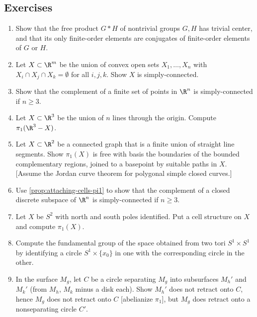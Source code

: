 \subsection*{Exercises}

\begin{enumerate}
\item Show that the free product $G*H$ of nontrivial groups $G,H$ has trivial
center, and that its only finite-order elements are conjugates of finite-order
elements of $G$ or $H$.

\item Let $X\subset\R^m$ be the union of convex open sets $X_1,\ldots,X_n$ with
$X_i\cap X_j\cap X_k=\emptyset$ for all $i,j,k$. Show $X$ is simply-connected.

\item Show that the complement of a finite set of points in $\R^n$ is
simply-connected if $n\ge 3$.

\item Let $X\subset\R^3$ be the union of $n$ lines through the origin. Compute
$\pi_1(\R^3-X)$.

\item Let $X\subset\R^2$ be a connected graph that is a finite union of straight line
segments. Show $\pi_1(X)$ is free with basis the boundaries of the bounded
complementary regions, joined to a basepoint by suitable paths in $X$. [Assume
the Jordan curve theorem for polygonal simple closed curves.]

\item Use \cref{prop:attaching-cells-pi1} to show that the complement of a closed
discrete subspace of $\R^n$ is simply-connected if $n\ge 3$.

\item Let $X$ be $S^2$ with north and south poles identified. Put a cell structure
on $X$ and compute $\pi_1(X)$.

\item Compute the fundamental group of the space obtained from two tori
$S^1\times S^1$ by identifying a circle $S^1\times\{x_0\}$ in one with the
corresponding circle in the other.

\item In the surface $M_g$, let $C$ be a circle separating $M_g$ into subsurfaces
$M_h'$ and $M_k'$ (from $M_h$, $M_k$ minus a disk each). Show $M_h'$ does not
retract onto $C$, hence $M_g$ does not retract onto $C$ [abelianize $\pi_1$], but
$M_g$ does retract onto a nonseparating circle $C'$.


\end{enumerate}
